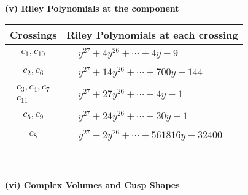 \documentclass[1p]{elsarticle_modified}
\theoremstyle{definition}
\begin{document}
\newpage\renewcommand{\arraystretch}{1}
\flushleft \textbf{(v) Riley Polynomials at the component}\newline \\
\begin{tabular}{m{50pt}|m{274pt}}
Crossings & \hspace{64pt}Riley Polynomials at each crossing \\
\hline $$\begin{aligned}c_{1},c_{10}\end{aligned}$$&$\begin{aligned}
&y^{27}+4 y^{26}+\cdots+4 y-9
\end{aligned}$\\
\hline $$\begin{aligned}c_{2},c_{6}\end{aligned}$$&$\begin{aligned}
&y^{27}+14 y^{26}+\cdots+700 y-144
\end{aligned}$\\
\hline $$\begin{aligned}c_{3},c_{4},c_{7}\\c_{11}\end{aligned}$$&$\begin{aligned}
&y^{27}+27 y^{26}+\cdots-4 y-1
\end{aligned}$\\
\hline $$\begin{aligned}c_{5},c_{9}\end{aligned}$$&$\begin{aligned}
&y^{27}+24 y^{26}+\cdots-30 y-1
\end{aligned}$\\
\hline $$\begin{aligned}c_{8}\end{aligned}$$&$\begin{aligned}
&y^{27}-2 y^{26}+\cdots+561816 y-32400
\end{aligned}$\\
\hline
\end{tabular}\\~\\
\newpage\flushleft \textbf{(vi) Complex Volumes and Cusp Shapes}
\end{document}
